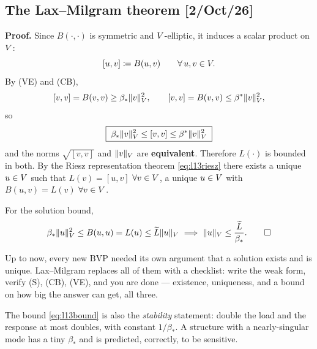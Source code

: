 \subsection*{The Lax--Milgram theorem \hfill {\normalfont\small [2/Oct/26]}}

\medskip\noindent{}

\medskip\noindent
\textbf{Proof.} Since $B(\cdot,\cdot)$ is symmetric and $V$-elliptic, it
induces a scalar product on $V$:
\begin{equation}\label{eq:l13energyip}
  [u,v]\coloneqq B(u,v)\qquad\forall\,u,v\in V .
\end{equation}
By (VE) and (CB),
\begin{equation}\label{eq:l13equiv}
  [v,v]=B(v,v)\ge\beta_{*}\lVert v\rVert^{2}_{V},
  \qquad
  [v,v]=B(v,v)\le\beta^{*}\lVert v\rVert^{2}_{V},
\end{equation}
so
\begin{equation}\label{eq:l13equiv2}
  \boxed{\;\beta_{*}\lVert v\rVert^{2}_{V}\le[v,v]\le\beta^{*}\lVert v\rVert^{2}_{V}\;}
\end{equation}
and the norms $\sqrt{[v,v]}$ and $\lVert v\rVert_{V}$ are \textbf{equivalent}.
Therefore $L(\cdot)$ is bounded in both. By the Riesz representation theorem
\eqref{eq:l13riesz} there exists a unique $u\in V$ such that
$L(v)=[u,v]$ $\forall v\in V$, \ie a unique $u\in V$ with
$B(u,v)=L(v)$ $\forall v\in V$.

\medskip
For the solution bound,
\begin{equation}\label{eq:l13bound}
  \beta_{*}\lVert u\rVert^{2}_{V}\le B(u,u)=L(u)\le\widetilde{L}\lVert u\rVert_{V}
  \ \Longrightarrow\
  \lVert u\rVert_{V}\le\frac{\widetilde{L}}{\beta_{*}} . \qed
\end{equation}

\begin{intuition}
Up to now, every new BVP needed its own argument that a solution exists and is
unique. Lax--Milgram replaces all of them with a checklist: write the weak
form, verify (S), (CB), (VE), and you are done --- existence, uniqueness, and a
bound on how big the answer can get, all three.

The bound \eqref{eq:l13bound} is also the \emph{stability} statement: double
the load and the response at most doubles, with constant $1/\beta_{*}$. A
structure with a nearly-singular mode has a tiny $\beta_{*}$ and is predicted,
correctly, to be sensitive.
\end{intuition}

